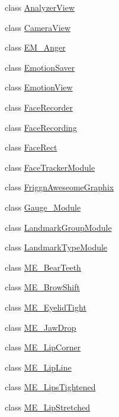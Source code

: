 \begin{DoxyCompactItemize}
\item 
class \hyperlink{class_real_sense_1_1_analyzer_view}{Analyzer\+View}
\item 
class \hyperlink{class_real_sense_1_1_camera_view}{Camera\+View}
\item 
class \hyperlink{class_real_sense_1_1_e_m___anger}{E\+M\+\_\+\+Anger}
\item 
class \hyperlink{class_real_sense_1_1_emotion_saver}{Emotion\+Saver}
\item 
class \hyperlink{class_real_sense_1_1_emotion_view}{Emotion\+View}
\item 
class \hyperlink{class_real_sense_1_1_face_recorder}{Face\+Recorder}
\item 
class \hyperlink{class_real_sense_1_1_face_recording}{Face\+Recording}
\item 
class \hyperlink{class_real_sense_1_1_face_rect}{Face\+Rect}
\item 
class \hyperlink{class_real_sense_1_1_face_tracker_module}{Face\+Tracker\+Module}
\item 
class \hyperlink{class_real_sense_1_1_friggn_aweseome_graphix}{Friggn\+Aweseome\+Graphix}
\item 
class \hyperlink{class_real_sense_1_1_gauge___module}{Gauge\+\_\+\+Module}
\item 
class \hyperlink{class_real_sense_1_1_landmark_group_module}{Landmark\+Group\+Module}
\item 
class \hyperlink{class_real_sense_1_1_landmark_type_module}{Landmark\+Type\+Module}
\item 
class \hyperlink{class_real_sense_1_1_m_e___bear_teeth}{M\+E\+\_\+\+Bear\+Teeth}
\item 
class \hyperlink{class_real_sense_1_1_m_e___brow_shift}{M\+E\+\_\+\+Brow\+Shift}
\item 
class \hyperlink{class_real_sense_1_1_m_e___eyelid_tight}{M\+E\+\_\+\+Eyelid\+Tight}
\item 
class \hyperlink{class_real_sense_1_1_m_e___jaw_drop}{M\+E\+\_\+\+Jaw\+Drop}
\item 
class \hyperlink{class_real_sense_1_1_m_e___lip_corner}{M\+E\+\_\+\+Lip\+Corner}
\item 
class \hyperlink{class_real_sense_1_1_m_e___lip_line}{M\+E\+\_\+\+Lip\+Line}
\item 
class \hyperlink{class_real_sense_1_1_m_e___lips_tightened}{M\+E\+\_\+\+Lips\+Tightened}
\item 
class \hyperlink{class_real_sense_1_1_m_e___lip_stretched}{M\+E\+\_\+\+Lip\+Stretched}

\end{DoxyCompactItemize}
